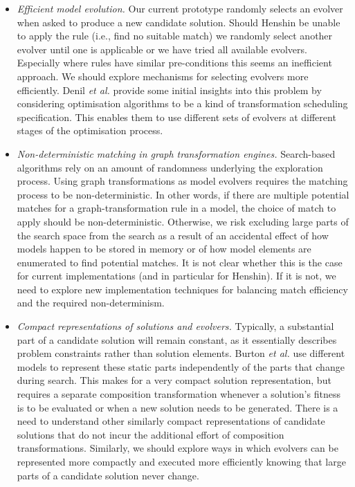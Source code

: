 \begin{itemize}
\begin{itemize}
						\item \emph{Efficient model evolution.} Our current prototype randomly selects an evolver when asked to produce a new candidate solution. Should Henshin be unable to apply the rule 
						      (i.e., find no suitable match) we randomly select another evolver until one is applicable or we have tried all available evolvers. Especially where rules have similar 
									pre-conditions this seems an inefficient approach. We should explore mechanisms for selecting evolvers more efficiently. Denil \emph{et al.} \cite{Denil+14} provide some initial
									insights into this problem by considering optimisation algorithms to be a kind of transformation scheduling specification. This enables them to use different sets of evolvers at
									different stages of the optimisation process.

						\item \emph{Non-deterministic matching in graph transformation engines.} Search-based algorithms rely on an amount of randomness underlying the exploration process. Using graph
						      transformations as model evolvers requires the matching process to be non-deterministic. In other words, if there are multiple potential matches for a graph-transformation rule in
									a model, the choice of match to apply should be non-deterministic. Otherwise, we risk excluding large parts of the search space from the search as a result of an accidental effect
									of how models happen to be stored in memory or of how model elements are enumerated to find potential matches. It is not clear whether this is the case for current implementations 
									(and in particular for Henshin). If it is not, we need to explore new implementation techniques for balancing match efficiency and the required non-determinism.
									
						\item \emph{Compact representations of solutions and evolvers.} Typically, a substantial part of a candidate solution will remain constant, as it essentially describes problem
						      constraints rather than solution elements. Burton \emph{et al.} \cite{Burton+12} use different models to represent these static parts independently of the parts that change during
									search. This makes for a very compact solution representation, but requires a separate composition transformation whenever a solution's fitness is to be evaluated or when a new
									solution needs to be generated. There is a need to understand other similarly compact representations of candidate solutions that do not incur the additional effort of composition
									transformations. Similarly, we should explore ways in which evolvers can be represented more compactly and executed more efficiently knowing that large parts of a candidate
									solution never change.
					\end{itemize}


\end{itemize}
